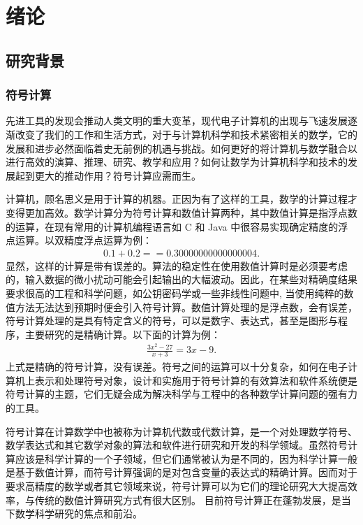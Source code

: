 \chapter{绪论}
\section{研究背景}
\subsection{符号计算}
先进工具的发现会推动人类文明的重大变革，现代电子计算机的出现与飞速发展逐渐改变了我们的工作和生活方式，对于与计算机科学和技术紧密相关的数学，它的发展和进步必然面临着史无前例的机遇与挑战。如何更好的将计算机与数学融合以进行高效的演算、推理、研究、教学和应用？如何让数学为计算机科学和技术的发展起到更大的推动作用？符号计算应需而生。

计算机，顾名思义是用于计算的机器。正因为有了这样的工具，数学的计算过程才变得更加高效。数学计算分为符号计算和数值计算两种，其中数值计算是指浮点数的运算，在现有常用的计算机编程语言如 C 和 Java 中很容易实现确定精度的浮点运算。以双精度浮点运算为例：
\begin{align}
0.1+0.2==0.30000000000000004.
\end{align}
显然，这样的计算是带有误差的。算法的稳定性在使用数值计算时是必须要考虑的，输入数据的微小扰动可能会引起输出的大幅波动。因此，在某些对精确度结果要求很高的工程和科学问题，如公钥密码学或一些非线性问题中, 当使用纯粹的数值方法无法达到预期时便会引入符号计算。数值计算处理的是浮点数，会有误差，符号计算处理的是具有特定含义的符号，可以是数字、表达式，甚至是图形与程序，主要研究的是精确计算。以下面的计算为例：
\begin{align}
\frac{3x^2-27}{x+3}=3x-9.
\end{align}
上式是精确的符号计算，没有误差。符号之间的运算可以十分复杂，如何在电子计算机上表示和处理符号对象，设计和实施用于符号计算的有效算法和软件系统便是符号计算的主题，它们无疑会成为解决科学与工程中的各种数学计算问题的强有力的工具。

符号计算在计算数学中也被称为计算机代数或代数计算，是一个对处理数学符号、数学表达式和其它数学对象的算法和软件进行研究和开发的科学领域。虽然符号计算应该是科学计算的一个子领域，但它们通常被认为是不同的，因为科学计算一般是基于数值计算，而符号计算强调的是对包含变量的表达式的精确计算。因而对于要求高精度的数学或者其它领域来说，符号计算可以为它们的理论研究大大提高效率，与传统的数值计算研究方式有很大区别。 目前符号计算正在蓬勃发展，是当下数学科学研究的焦点和前沿。

